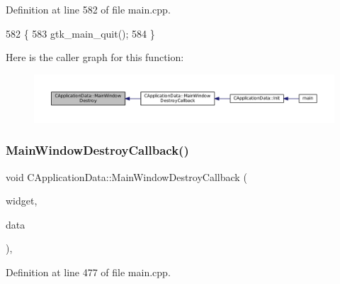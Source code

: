 Definition at line 582 of file main.\+cpp.


\begin{DoxyCode}
582                                                          \{
583     gtk\_main\_quit();
584 \}
\end{DoxyCode}
Here is the caller graph for this function\+:
\nopagebreak
\begin{figure}[H]
\begin{center}
\leavevmode
\includegraphics[width=350pt]{classCApplicationData_a202437b2380956a5519722937cd9f96a_icgraph}
\end{center}
\end{figure}
\hypertarget{classCApplicationData_a379327c78dc57aa9dcef77e1b98efa2d}{}\label{classCApplicationData_a379327c78dc57aa9dcef77e1b98efa2d} 
\subsubsection{\texorpdfstring{Main\+Window\+Destroy\+Callback()}{MainWindowDestroyCallback()}}
{\footnotesize\ttfamily void C\+Application\+Data\+::\+Main\+Window\+Destroy\+Callback (\begin{DoxyParamCaption}\item[{Gtk\+Widget $\ast$}]{widget,  }\item[{gpointer}]{data }\end{DoxyParamCaption})\hspace{0.3cm}{\ttfamily [static]}, {\ttfamily [protected]}}



Definition at line 477 of file main.\+cpp.


